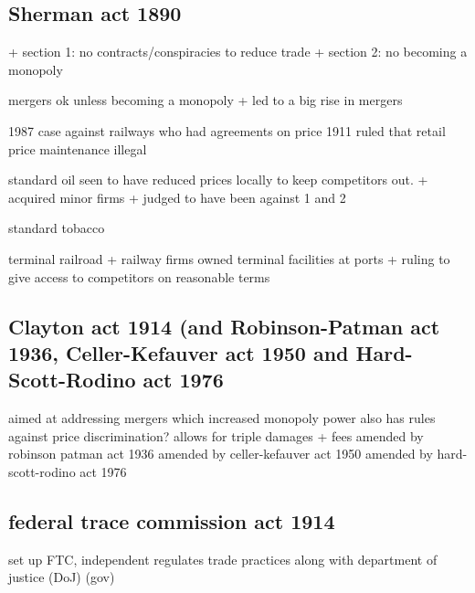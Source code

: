 
\subsection{Sherman act 1890}

+ section 1: no contracts/conspiracies to reduce trade
+ section 2: no becoming a monopoly

mergers ok unless becoming a monopoly
+ led to a big rise in mergers

1987 case against railways who had agreements on price
1911 ruled that retail price maintenance illegal

standard oil seen to have reduced prices locally to keep competitors out.
+ acquired minor firms
+ judged to have been against 1 and 2

standard tobacco

terminal railroad
+ railway firms owned terminal facilities at ports
+ ruling to give access to competitors on reasonable terms




\subsection{Clayton act 1914 (and Robinson-Patman act 1936, Celler-Kefauver act 1950 and Hard-Scott-Rodino act 1976}

aimed at addressing mergers which increased monopoly power
also has rules against price discrimination?
allows for triple damages + fees
amended by robinson patman act 1936
amended by celler-kefauver act 1950
amended by hard-scott-rodino act 1976


\subsection{federal trace commission act 1914}
set up FTC, independent
regulates trade practices along with department of justice (DoJ) (gov)


